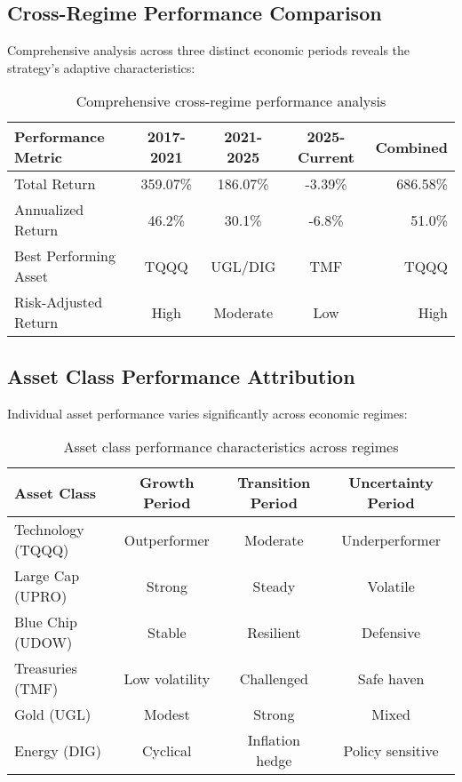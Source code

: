 \documentclass[onecolumn,11pt]{IEEEtran}
\begin{document}
\subsection{Cross-Regime Performance Comparison}

Comprehensive analysis across three distinct economic periods reveals the strategy's adaptive characteristics:

\begin{table}[h]
\centering
\begin{tabular}{lcccr}
\toprule
\textbf{Performance Metric} & \textbf{2017-2021} & \textbf{2021-2025} & \textbf{2025-Current} & \textbf{Combined} \\
\midrule
Total Return & 359.07\% & 186.07\% & -3.39\% & 686.58\% \\
Annualized Return & 46.2\% & 30.1\% & -6.8\% & 51.0\% \\
Best Performing Asset & TQQQ & UGL/DIG & TMF & TQQQ \\
Risk-Adjusted Return & High & Moderate & Low & High \\
\bottomrule
\end{tabular}
\caption{Comprehensive cross-regime performance analysis}
\end{table}

\subsection{Asset Class Performance Attribution}

Individual asset performance varies significantly across economic regimes:

\begin{table}[h]
\centering
\begin{tabular}{lccc}
\toprule
\textbf{Asset Class} & \textbf{Growth Period} & \textbf{Transition Period} & \textbf{Uncertainty Period} \\
\midrule
Technology (TQQQ) & Outperformer & Moderate & Underperformer \\
Large Cap (UPRO) & Strong & Steady & Volatile \\
Blue Chip (UDOW) & Stable & Resilient & Defensive \\
Treasuries (TMF) & Low volatility & Challenged & Safe haven \\
Gold (UGL) & Modest & Strong & Mixed \\
Energy (DIG) & Cyclical & Inflation hedge & Policy sensitive \\
\bottomrule
\end{tabular}
\caption{Asset class performance characteristics across regimes}
\end{table}
\end{document}
